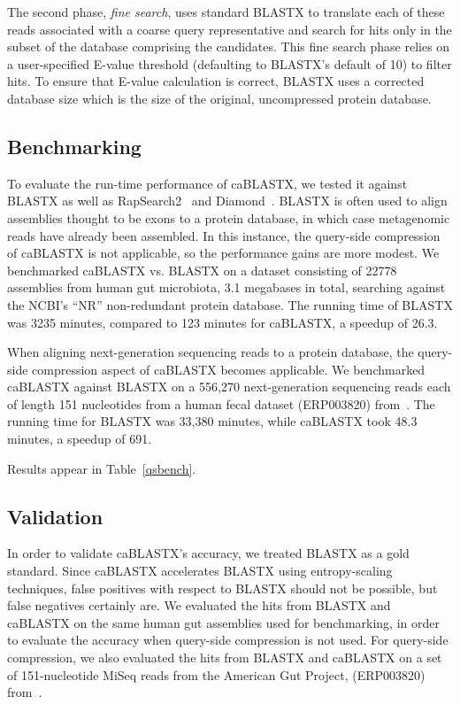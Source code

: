 \documentclass{amsbook}
\theoremstyle{definition}
\theoremstyle{remark}
\numberwithin{equation}{section}
\begin{document}
The second phase, \emph{fine search}, uses standard BLASTX to translate each
of these reads associated with a coarse query representative and search for
hits only in the subset of the database comprising the candidates.
This fine search phase relies on a user-specified E-value threshold (defaulting
to BLASTX's default of 10) to filter hits.
To ensure that E-value calculation is correct, BLASTX uses a corrected database
size which is the size of the original, uncompressed protein database.

\subsection*{Benchmarking}

To evaluate the run-time performance of caBLASTX, we tested it against
BLASTX as well as RapSearch2~\cite{rs2} and Diamond~\cite{diamond}.
BLASTX is often used to align assemblies thought to be exons to a protein
database, in which case metagenomic reads have already been assembled.
In this instance, the query-side compression of caBLASTX is not applicable, so
the performance gains are more modest.
We benchmarked caBLASTX vs. BLASTX on a dataset consisting of 22778 assemblies
from human gut microbiota, 3.1 megabases in total, searching against the NCBI's
``NR'' non-redundant protein database.
The running time of BLASTX was 3235 minutes, compared to 123 minutes for caBLASTX, a speedup of 26.3.

When aligning next-generation sequencing reads to a protein database, the
query-side compression aspect of caBLASTX becomes applicable.
We benchmarked caBLASTX against BLASTX on a 556,270
next-generation sequencing reads each of length 151 nucleotides from a human 
fecal dataset (ERP003820) from~\cite{blah}.
The running time for BLASTX was 33,380 minutes, while caBLASTX took 48.3 
minutes, a speedup of 691.
 
Results appear in Table~\ref{qsbench}.




\subsection*{Validation}

In order to validate caBLASTX's accuracy, we treated BLASTX as a gold standard. 
Since caBLASTX accelerates BLASTX
using entropy-scaling techniques, false positives with respect to BLASTX should 
not be possible, but false negatives certainly are.
We evaluated the hits from BLASTX and caBLASTX on the same human gut
assemblies used for benchmarking, in order to evaluate the accuracy when
query-side compression is not used.
For query-side compression, we also evaluated the hits from BLASTX and caBLASTX
on a set of 151-nucleotide MiSeq reads from the American Gut Project,
(ERP003820) from~\cite{blah}.
\end{document}
